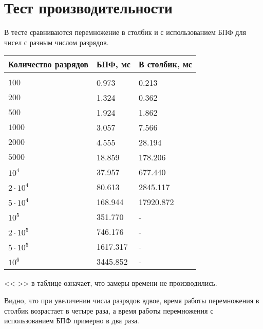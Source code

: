 \section{Тест производительности}
В тесте сравниваются перемножение в столбик и с использованием БПФ для чисел с разным числом разрядов.

\begin{longtable}{|p{4.5cm}|p{3cm}|p{3cm}|}
    \hline
    Количество разрядов&БПФ, мс&В столбик, мс\\
    \hline
    \rowcolor{lightgray}
    \multicolumn{3}{|c|} {}\\
    \hline
    $100$&0.973&0.213\\
    \hline
    $200$&1.324&0.362\\
    \hline
    $500$&1.924&1.862\\
    \hline
    $1000$&3.057&7.566\\
    \hline
    $2000$&4.555&28.194\\
    \hline
    $5000$&18.859&178.206\\
    \hline
    $10^4$&37.957&677.440\\
    \hline
    $2\cdot10^4$&80.613&2845.117\\
    \hline
    $5\cdot10^4$&168.944&17920.872\\
    \hline
    $10^5$&351.770&-\\
    \hline
    $2\cdot10^5$&746.176&-\\
    \hline
    $5\cdot10^5$&1617.317&-\\
    \hline
    $10^6$&3445.852&-\\
    \hline
\end{longtable}

<<->> в таблице означает, что замеры времени не производились.

Видно, что при увеличении числа разрядов вдвое, время работы перемножения в столбик возрастает в четыре раза, а время работы перемножения с использованием БПФ примерно в два раза.

\pagebreak
